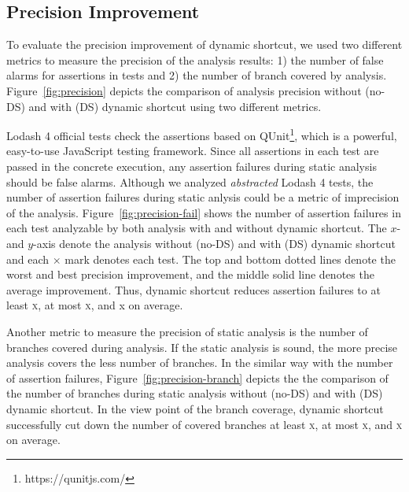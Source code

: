 \subsection{Precision Improvement}

To evaluate the precision improvement of dynamic shortcut, we used two different
metrics to measure the precision of the analysis results: 1) the number of false
alarms for assertions in tests and 2) the number of branch covered by analysis.
Figure~\ref{fig:precision} depicts the comparison of analysis precision without
(no-DS) and with (DS) dynamic shortcut using two different metrics.

Lodash 4 official tests check the assertions based on
QUnit\footnote{https://qunitjs.com/}, which is a powerful, easy-to-use
JavaScript testing framework.  Since all assertions in each test are passed in
the concrete execution, any assertion failures during static analysis should be
false alarms.  Although we analyzed \textit{abstracted} Lodash 4 tests, the
number of assertion failures during static anlysis could be a metric of
imprecision of the analysis.  Figure~\ref{fig:precision-fail} shows the number
of assertion failures in each test analyzable by both analysis with and
without dynamic shortcut.  The $x$- and $y$-axis denote the analysis without
(no-DS) and with (DS) dynamic shortcut and each $\times$ mark denotes each test.
The top and bottom dotted lines denote the worst and best precision improvement,
and the middle solid line denotes the average improvement.  Thus, dynamic
shortcut reduces assertion failures to at least \textsc{x}, at most
\textsc{x}, and x on average.

Another metric to measure the precision of static analysis is the number of
branches covered during analysis.  If the static analysis is sound, the more
precise analysis covers the less number of branches.  In the similar way with
the number of assertion failures, Figure~\ref{fig:precision-branch} depicts the
the comparison of the number of branches during static analysis without (no-DS)
and with (DS) dynamic shortcut.  In the view point of the branch coverage,
dynamic shortcut successfully cut down the number of covered branches at least
\textsc{x}, at most \textsc{x}, and
\textsc{x} on average.

